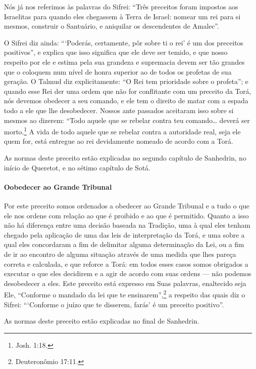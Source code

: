 Nós já nos referimos às palavras do Sifrei: ``Três preceitos foram
impostos aos Israelitas para quando eles chegassem à Terra de Israel:
nomear um rei para si mesmos, construir o Santuário, e aniquilar os
descendentes de Amalec''.

O Sifrei diz ainda: ```Poderás, certamente, pôr sobre ti o rei' é um dos
preceitos positivos'', e explica que isso significa que ele deve ser
temido, e que nosso respeito por ele e estima pela sua grandeza e
supremacia devem ser tão grandes que o coloquem num nível de honra superior ao de todos
os profetas de sua geração. O Talmud diz explicitamente: ``O Rei tem
prioridade sobre o profeta''; e quando esse Rei der uma ordem que não for
conflitante com um preceito da Torá, nós devemos obedecer a seu comando, e ele tem
o direito de matar com a espada todo a ele que lhe desobedecer. Nossos
ante passados aceitaram isso sobre si mesmos ao dizerem: ``Todo aquele que se
rebelar contra teu comando\ldots{} deverá ser morto.\footnote{Josh. 1:18.} A vida de
todo aquele que se rebelar contra a autoridade real, seja ele quem for, está entregue ao rei devidamente nomeado de acordo com a Torá.

As normas deste preceito estão explicadas no segundo capítulo de
Sanhedrin, no início de Queretot, e no sétimo capítulo de Sotá.

\paragraph{Oobedecer ao Grande Tribunal}

Por este preceito somos ordenados a obedecer ao Grande Tribunal e a tudo
o que ele nos ordene com relação ao que é proibido e ao que é permitido. Quanto a isso não há diferença entre uma decisão baseada na
Tradição, uma à qual eles tenham chegado pela aplicação de uma das leis
de interpretação da Torá, e uma sobre a qual eles concordaram a fim de
delimitar alguma determinação da Lei, ou a fim de ir ao encontro de
alguma situação através de uma medida que lhes pareça correta e
calculada, e que reforce a Torá: em todos esses casos somos obrigados a
executar o que eles decidirem e a agir de acordo com suas ordens --- não
podemos desobedecer a eles. Este preceito está expresso em Suas
palavras, enaltecido seja Ele, ``Conforme o mandado da lei que te
ensinarem'',\footnote{Deuteronômio 17:11.} a respeito das quais diz o Sifrei:
```Conforme o juízo que te disserem, farás' é um preceito positivo''.

As normas deste preceito estão explicadas no final de Sanhedrin.

